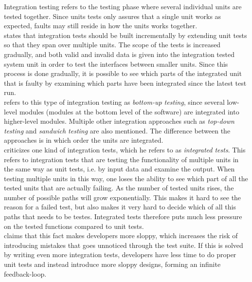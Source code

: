 Integration testing refers to the testing phase where several individual
units are tested together. Since units tests only assures that a single
unit works as expected, faults may still reside in how the units works
together.\\

\citet{book:adp} states that integration tests should be built
incrementally by extending unit tests so that they span over multiple
units. The scope of the tests is increased gradually, and both valid and
invalid data is given into the integration tested system unit in order
to test the interfaces between smaller units. Since this process is done
gradually, it is possible to see which parts of the integrated unit that
is faulty by examining which parts have been integrated since the latest
test run.\\

\citet{book:pfleeger} refers to this type of integration testing as
\emph{bottom-up testing}, since several low-level modules (modules at
the bottom level of the software) are integrated into higher-level
modules. Multiple other integration approaches such as \emph{top-down
testing} and \emph{sandwich testing} are also mentioned. The difference
between the approaches is in which order the units are integrated.\\

\citet{video:integrated_scam} criticizes one kind of integration tests,
which he refers to as \emph{integrated tests}. This refers to
integration tests that are testing the functionality of multiple units
in the same way as unit tests, i.e. by input data and examine the
output. When testing multiple units in this way, one loses the ability
to see which part of all the tested units that are actually failing. As
the number of tested units rises, the number of possible paths will grow
exponentially. This makes it hard to see the reason for a failed test,
but also makes it very hard to decide which of all this paths that needs
to be testes. Integrated tests therefore puts much less pressure on the
tested functions compared to unit tests.\\

\citeauthor{video:integrated_scam} claims that this fact makes
developers more sloppy, which increases the risk of introducing mistakes
that goes unnoticed through the test suite. If this is solved by writing
even more integration tests, developers have less time to do proper unit
tests and instead introduce more sloppy designs, forming an infinite
feedback-loop.\\

